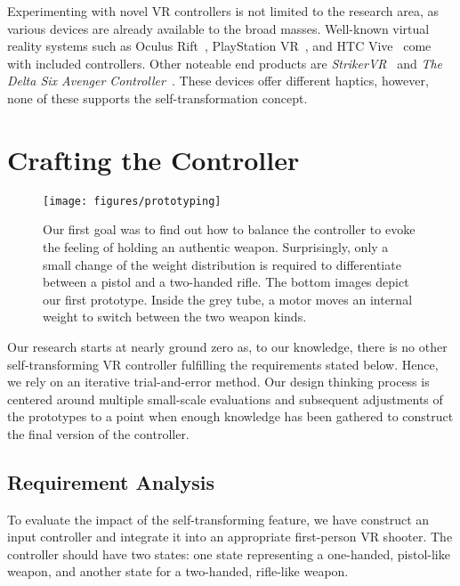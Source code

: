 \documentclass{sigchi}
\begin{document}
Experimenting with novel VR controllers is not limited to the research area, as various devices are already available to the broad masses. Well-known virtual reality systems such as Oculus Rift~\cite{oculus}, PlayStation VR~\cite{ps}, and HTC Vive~\cite{vive} come with included controllers. Other noteable end products are \textit{StrikerVR}~\cite{strikervr} and \textit{The Delta Six Avenger Controller}~\cite{avengercontroller}. These devices offer different haptics, however, none of these supports the self-transformation concept.


\section{Crafting the Controller}

\begin{figure}
\centering
\texttt{[image: figures/prototyping]}
\caption{Our first goal was to find out how to balance the controller to evoke the feeling of holding an authentic weapon. Surprisingly, only a small change of the weight distribution is required to differentiate between a pistol and a two-handed rifle. The bottom images depict our first prototype. Inside the grey tube, a motor moves an internal weight to switch between the two weapon kinds.}
\label{fig:prototype}
\end{figure}



Our research starts at nearly ground zero as, to our knowledge, there is no other self-transforming VR controller fulfilling the requirements stated below. Hence, we rely on an iterative trial-and-error method. Our design thinking process is centered around multiple small-scale evaluations and subsequent adjustments of the prototypes to a point when enough knowledge has been gathered to construct the final version of the controller.

\subsection{Requirement Analysis}

To evaluate the impact of the self-transforming feature, we have construct an input controller and integrate it into an appropriate first-person VR shooter. The controller should have two states: one state representing a one-handed, pistol-like weapon, and another state for a two-handed, rifle-like weapon. 
\end{document}
